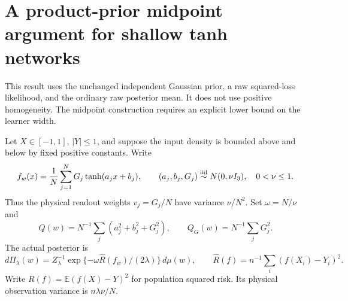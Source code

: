 \section{A product-prior midpoint argument for shallow tanh networks}
\label{sec:tanh-product-midpoint}
This result uses the unchanged independent Gaussian prior, a raw squared-loss
likelihood, and the ordinary raw posterior mean. It does not use positive
homogeneity. The midpoint construction requires an explicit lower bound
on the learner width.

Let $X\in[-1,1]$, $|Y|\le1$, and suppose the input density is bounded
above and below by fixed positive constants. Write
\[
 f_w(x)=\frac1N\sum_{j=1}^N G_j\tanh(a_jx+b_j),\qquad
 (a_j,b_j,G_j)\stackrel{\rm iid}{\sim}N(0,\nu I_3),\quad0<\nu\le1.
\]
Thus the physical readout weights $v_j=G_j/N$ have variance $\nu/N^2$.
Set $\omega=N/\nu$ and
\[
 Q(w)=N^{-1}\sum_j(a_j^2+b_j^2+G_j^2),\qquad
 Q_G(w)=N^{-1}\sum_jG_j^2.
\]
The actual posterior is
\[
 d\Pi_\lambda(w)=Z_\lambda^{-1}
 \exp\{-\omega\widehat R(f_w)/(2\lambda)\}\,d\mu(w),
 \qquad \widehat R(f)=n^{-1}\sum_i(f(X_i)-Y_i)^2.
\]
Write $R(f)=\mathbb E(f(X)-Y)^2$ for population squared risk.
Its physical observation variance is $n\lambda\nu/N$.

